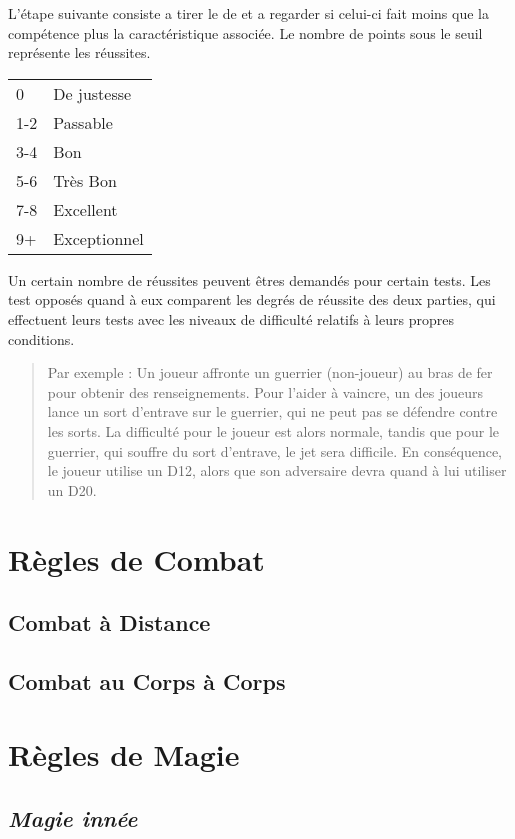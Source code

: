 L'étape suivante consiste a tirer le de et a regarder si celui-ci fait moins que la compétence plus la caractéristique associée. Le nombre de points sous le seuil représente les réussites.
\begin{center}
\begin{tabular}{ll}
0   & De justesse\\
1-2 & Passable\\
3-4 & Bon\\
5-6 & Très Bon\\
7-8 & Excellent\\
9+  & Exceptionnel
\end{tabular}
\end{center}
Un certain nombre de réussites peuvent êtres demandés pour certain tests. 
Les test opposés quand à eux comparent les degrés de réussite des deux parties, 
qui effectuent leurs tests avec les niveaux de difficulté relatifs à leurs propres conditions.
\begin{quote}
    Par exemple : Un joueur affronte un guerrier (non-joueur) au bras de fer  pour obtenir des renseignements. 
    Pour l'aider à vaincre, un des joueurs lance un sort d'entrave sur le guerrier, qui ne peut pas se défendre contre les sorts. 
    La difficulté pour le joueur est alors normale, tandis que pour le guerrier, qui souffre du sort d'entrave, le jet sera difficile. 
    En conséquence, le joueur utilise un D12, alors que son adversaire devra quand à lui utiliser un D20.
\end{quote}
\section{Règles de Combat}
\subsection{Combat à Distance}
\subsection{Combat au Corps à Corps}

\section{Règles de Magie}

\subsection{\em Magie innée}

